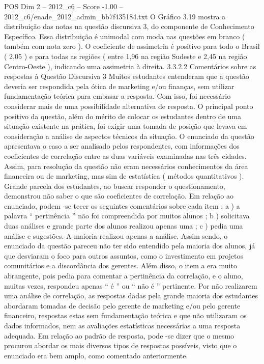 \begin{textsample}{POS Dim 2 – 2012\_c6 – Score -1.00 – 2012\_c6/enade\_2012\_admin\_bb7f435184.txt}
O Gráfico 3.19 mostra a distribuição das notas na questão discursiva 3, do componente de Conhecimento Específico.
Essa distribuição é unimodal com moda nas questões em branco ( também com nota zero ).
O coeficiente de assimetria é positivo para todo o Brasil ( 2,05 ) e para todas as regiões ( entre 1,96 na região Sudeste e 2,45 na região Centro-Oeste ), indicando uma assimetria à direita. 3.3.2.2 Comentários sobre as respostas à Questão Discursiva 3 Muitos estudantes entenderam que a questão deveria ser respondida pela ótica de marketing e/ou finanças, sem utilizar fundamentação teórica para embasar a resposta.
Com isso, foi necessário considerar mais de uma possibilidade alternativa de resposta.
O principal ponto positivo da questão, além do mérito de colocar os estudantes dentro de uma situação existente na prática, foi exigir uma tomada de posição que levava em consideração a análise de aspectos técnicos da situação.
O enunciado da questão apresentava o caso a ser analisado pelos respondentes, com informações dos coeficientes de correlação entre as duas variáveis examinadas nas três cidades.
Assim, para resolução da questão não eram necessários conhecimentos da área financeira ou de marketing, mas sim de estatística ( métodos quantitativos ).
Grande parcela dos estudantes, ao buscar responder o questionamento, demonstrou não saber o que são coeficientes de correlação.
Em relação ao enunciado, podem -se tecer os seguintes comentários sobre cada item : a ) a palavra “ pertinência ” não foi compreendida por muitos alunos ; b ) solicitava duas análises e grande parte dos alunos realizou apenas uma ; c ) pedia uma análise e sugestões.
A maioria realizou apenas a análise.
Assim sendo, o enunciado da questão pareceu não ter sido entendido pela maioria dos alunos, já que desviaram o foco para outros assuntos, como o investimento em projetos comunitários e a discordância dos gerentes.
Além disso, o item a era muito abrangente, pois pedia para comentar a pertinência da correlação, e o aluno, muitas vezes, respondeu apenas “ é ” ou “ não é ” pertinente.
Por não realizarem uma análise de correlação, as respostas dadas pela grande maioria dos estudantes abordaram tomadas de decisão pelo gerente de marketing e/ou pelo gerente financeiro, respostas estas sem fundamentação teórica e que não utilizaram os dados informados, nem as avaliações estatísticas necessárias a uma resposta adequada.
Em relação ao padrão de resposta, pode -se dizer que o mesmo procurou abordar os mais diversos tipos de respostas possíveis, visto que o enunciado era bem amplo, como comentado anteriormente.

\end{textsample}
